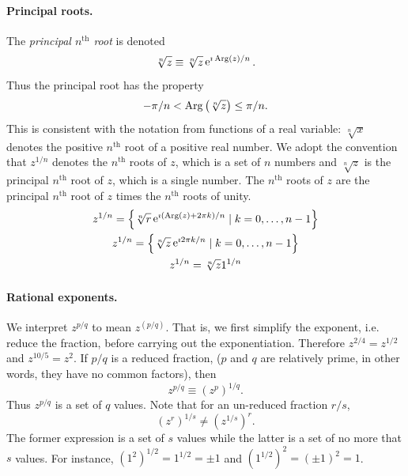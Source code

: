 \paragraph{Principal roots.}
The \textit{principal $n^{\mathrm{th}}$ root} is denoted
\[
\sqrt[n]{z} \equiv \sqrt[n]{z} \mathop{\mathrm{e}}\nolimits^{\imath \mathop{\mathrm{Arg}}\nolimits(z) / n}.
\]
Thus the principal root has the property
\[
- \pi / n < \mathop{\mathrm{Arg}}\nolimits \left( \sqrt[n]{z} \right) \leq \pi / n.
\]
This is consistent with the notation from functions of a real variable:
$\sqrt[n]{x}$ denotes the positive $n^{\mathrm{th}}$ root of a positive 
real number.  We adopt the convention that $z^{1/n}$ denotes the 
$n^{\mathrm{th}}$ roots of $z$, which is a set of $n$ numbers and 
$\sqrt[n]{z}$ is the principal $n^{\mathrm{th}}$ root of $z$, which is a 
single number.  
The $n^{\mathrm{th}}$ roots of $z$ are the principal $n^{\mathrm{th}}$
root of $z$ times the $n^{\mathrm{th}}$ roots of unity.
\begin{gather*}
  z^{1/n} = \left\{ \sqrt[n]{r} \mathop{\mathrm{e}}\nolimits^{\imath (\mathop{\mathrm{Arg}}\nolimits(z) + 2 \pi k) / n } \mid k = 0, \ldots, n-1 \right\} 
  \\
  z^{1/n} = \left\{ \sqrt[n]{z} \mathop{\mathrm{e}}\nolimits^{\imath 2 \pi k / n } \mid k = 0, \ldots, n-1 \right\} 
  \\
  z^{1/n} = \sqrt[n]{z} 1^{1/n}
\end{gather*}




\paragraph{Rational exponents.}
We interpret $z^{p/q}$ to mean $z^{(p/q)}$.  That is, we first simplify
the exponent, i.e. reduce the fraction,  before carrying out the 
exponentiation.  Therefore $z^{2/4} = z^{1/2}$ and $z^{10/5} = z^2$.
If $p/q$ is a reduced fraction, ($p$ and $q$ are relatively prime, in other
words, they have no common factors), then 
\[
z^{p/q} \equiv \left( z^p \right)^{1/q}.
\]
Thus $z^{p/q}$ is a set of $q$ values.  Note that for an un-reduced fraction
$r/s$, 
\[
\left( z^r \right)^{1/s} \neq \left( z^{1/s} \right)^r.
\]
The former expression is a set of $s$ values while the latter is a set of
no more that $s$ values.  For instance, $\left( 1^2 \right)^{1/2} = 1^{1/2} = \pm 1$
and $\left( 1^{1/2} \right)^2 = (\pm 1)^2 = 1$.






